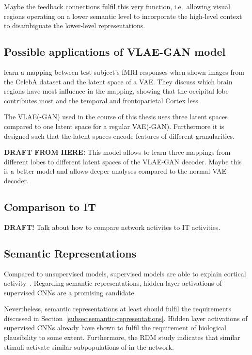 Maybe the feedback connections fulfil this very function, i.e.\ allowing visual regions operating on a lower semantic level to incorporate the high-level context to disambiguate the lower-level representations.

\subsection{Possible applications of VLAE-GAN model}
\citet{vanrullen2019reconstructing} learn a mapping between test subject's fMRI responses when shown images from the CelebA dataset and the latent space of a \ac{VAE}.
They discuss which brain regions have most influence in the mapping, showing that the occipital lobe contributes most and the temporal and frontoparietal Cortex less.

The \ac{VLAE}(-\ac{GAN}) used in the course of this thesis uses three latent spaces compared to one latent space for a regular \ac{VAE}(-\ac{GAN}).
Furthermore it is designed such that the latent spaces encode features of different granularities.

\textbf{DRAFT FROM HERE:}
This model allows to learn three mappings from different lobes to different latent spaces of the VLAE-GAN decoder.
Maybe this is a better model and allows deeper analyses compared to the normal VAE decoder.

\subsection{Comparison to \ac{IT}}
\textbf{DRAFT!}
Talk about how to compare network activites to IT activities.

\subsection{Semantic Representations}\label{subsec:semantic-representations-results}
Compared to unsupervised models, supervised models are able to explain cortical activity~\citep{khaligh2014deep,cadieu2014deep}.
Regarding semantic representations, hidden layer activations of supervised \acp{CNN} are a promising candidate.

Nevertheless, semantic representations at least should fulfil the requirements discussed in Section~\ref{subsec:semantic-representations}.
Hidden layer activations of supervised \acp{CNN} already have shown to fulfil the requirement of biological plausibility to some extent.
Furthermore, the \ac{RDM} study indicates that similar stimuli activate similar subpopulations of  in the network.

